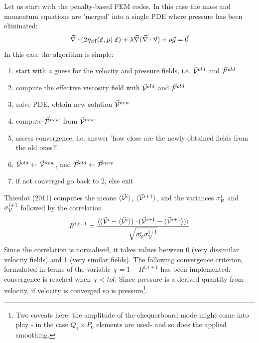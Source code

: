 Let us start with the penalty-based FEM codes. In this case the mass and momentum 
equations are 'merged' into a single PDE where pressure has been eliminated:
\[
\vec\nabla\cdot (2 \eta_{\rm eff}(\dot{\bm\varepsilon},p) \;  \dot{\bm\varepsilon}) 
+\lambda \vec\nabla (\vec\nabla \cdot \vec\upnu) + \rho \vec{g} = \vec{0} 
\]
In this case the algorithm is simple:
\begin{enumerate}
\item start with a guess for the velocity and pressure fields, i.e. $\vec{\cal V}^{old}$ 
and $\vec{\cal P}^{old}$
\item compute the effective viscosity field with $\vec{\cal V}^{old}$ and $\vec{\cal P}^{old}$
\item solve PDE, obtain new solution $\vec{\cal V}^{new}$ 
\item compute $\vec{\cal P}^{new}$ from $\vec{\cal V}^{new}$
\item assess convergence, i.e. answer 'how close are the newly obtained fields from the old ones?'
\item $\vec{\cal V}^{old} \leftarrow \vec{\cal V}^{new}$, and $\vec{\cal P}^{old} \leftarrow \vec{\cal P}^{new}$
\item if not converged go back to 2, else exit
\end{enumerate}

Thieulot (2011) \cite{thie11} computes the means
$\langle \vec{\cal V}^i\rangle$, 
$\langle \vec{\cal V}^{i+1}\rangle$, 
and the variances 
$\sigma_{\cal V}^i$ and 
$\sigma_{\cal V}^{i+1}$ 
followed by the correlation 
\[
R^{i,i+1} = \frac{\langle (\vec{\cal V}^i - \langle \vec{\cal V}^i\rangle)
\cdot ( \vec{\cal V}^{i+1} - \langle \vec{\cal V}^{i+1}\rangle) \rangle }
{\sqrt{\sigma_{\cal V}^i \sigma_{\cal V}^{i+1}}}
\]
Since the correlation is normalised, it takes values between 0
(very dissimilar velocity fields) and 1 (very similar fields). The
following convergence criterion, formulated in terms of the variable $\chi = 1 -R^{i,i+1} $
has been implemented: convergence is reached when $\chi<tol$.
Since pressure is a derived quantity from velocity, if velocity is converged so is 
pressure\footnote{Two caveats here: the amplitude of the chequerboard mode
might come into play - in the case $Q_1\times P_0$ elements are used- and so does the applied smoothing.}.

